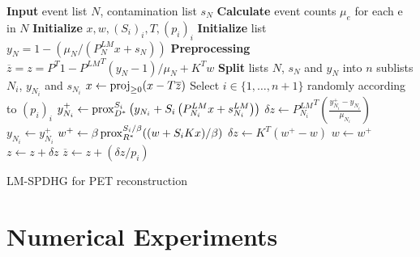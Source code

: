 \begin{algorithm}[t]
\begin{algorithmic}[1]
\small
\State \textbf{Input} event list $N$, contamination list $s_N$
\State \textbf{Calculate} event counts $\mu_e$ for each e in $N$
\State \textbf{Initialize} $x,w,(S_i)_i,T,(p_i)_i$
\State \textbf{Initialize} list $y_{N} = 1 - (\mu_N /(P^{LM}_{N} x + s_{N}))$ 
\State \textbf{Preprocessing} $\overline{z} = z = {P^T} 1 - {P^{LM}}^T (y_N-1)/\mu_N + K^T w$ %
\State \textbf{Split} lists $N$, $s_N$ and $y_N$ into $n$ sublists $N_i$, $y_{N_i}$ and $s_{N_i}$
\Repeat
	\State $x \gets \operatorname{proj}_{\geq 0} (x - T \overline{z})$
	\State Select $i \in \{1,\ldots,n+1\}$ randomly according to $(p_i)_i$
	  \State $y_{N_i}^+ \gets \operatorname{prox}_{D^*}^{S_i} \left( y_{N_i} + S_i \left(P^{LM}_{N_i} x + s^{LM}_{N_i} \right) \right)$
	  \State $\delta z \gets {P^{LM}_{N_i}}^T \left(\frac{y_{N_i}^+ - y_{N_i}}{\mu_{N_i}}\right)$
	  \State $y_{N_i} \gets y_{N_i}^+$
  \Else
	  \State $w^+ \gets \beta \operatorname{prox}_{R^*}^{S_i/\beta} ((w + S_i  K x)/\beta)$
	  \State $\delta z \gets K^T \left(w^+ - w\right)$
	  \State $w \gets w^+$
  \EndIf
	\State $z \gets z + \delta z$
	\State $\overline{z} \gets  z + (\delta z/p_i)$
\State {}
\end{algorithmic}
\caption{LM-SPDHG for PET reconstruction}
\label{alg:lmspdhg}
\end{algorithm}



\section{Numerical Experiments}

